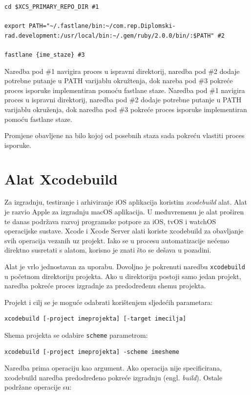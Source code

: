 \documentclass[times, utf8, diplomski, numeric]{fer}
\newcommand{\eng}[1]{(engl. \textit{#1})}
\begin{document}
\begin{appendices}
\begin{lstlisting}[caption=Sadržaj faze nakon obavljanja isporuke, label=listing:bot_fastlane_call]
cd $XCS_PRIMARY_REPO_DIR #1

export PATH="~/.fastlane/bin:~/com.rep.Diplomski-rad.development:/usr/local/bin:~/.gem/ruby/2.0.0/bin/:$PATH" #2

fastlane {ime_staze} #3
\end{lstlisting}

Naredba pod \#1 navigira proces u ispravni direktorij, naredba pod \#2 dodaje potrebne putanje u PATH varijablu okružtenja, dok nareba pod \#3 pokreće proces isporuke implementiran pomoću fastlane staze.
Naredba pod \#1 navigira proces u ispravni direktorij, naredba pod \#2 dodaje potrebne putanje u PATH varijablu okruženja, dok naredba pod \#3 pokreće proces isporuke implementiran pomoću fastlane staze.

Promjene obavljene na bilo kojoj od posebnih staza sada pokreću vlastiti proces isporuke.


\chapter{Alat Xcodebuild} \label{header:xcodebuild}

Za izgradnju, testiranje i arhiviranje iOS aplikacija koristim \textit{xcodebuild} alat. Alat je razvio Apple za izgradnju macOS aplikacija. U međuvremenu je alat proširen te danas podržava razvoj programske potpore za iOS, tvOS i watchOS operacijske sustave. Xcode i Xcode Server alati koriste xcodebuild za obavljanje svih operacija vezanih uz projekt. Iako se u procesu automatizacije nećemo direktno susretati s alatom, korisno je znati što se dešava u pozadini.

Alat je vrlo jednostavan za uporabu. Dovoljno je pokrenuti naredbu \verb|xcodebuild| u početnom direktoriju projekta. Ako u direktoriju postoji samo jedan projekt, naredba pokreće proces izgradnje za predodređenu shemu projekta.

Projekt i cilj se je moguće odabrati korištenjem sljedećih parametara:

\begin{verbatim}
xcodebuild [-project imeprojekta] [-target imecilja]
\end{verbatim}

Shema projekta se odabire \verb|scheme| parametrom:

\begin{verbatim}
xcodebuild [-project imeprojekta] -scheme imesheme
\end{verbatim}

Naredba prima operaciju kao argument. Ako operacija nije specificirana, xcodebuild naredba predodređeno pokreće izgradnju \eng{build}. Ostale podržane operacije su:


\end{appendices}
\end{document}
